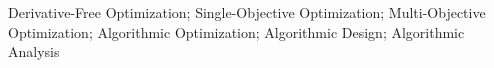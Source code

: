 \noindent Derivative-Free Optimization; Single-Objective Optimization; Multi-Objective Optimization; Algorithmic Optimization; Algorithmic Design; Algorithmic Analysis